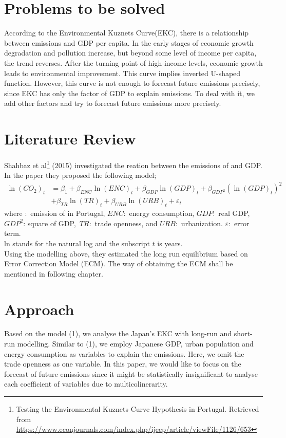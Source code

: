 \documentclass[12pt, a4paper]{article}
\begin{document}
\section{Problems to be solved}
According to the Environmental Kuznets Curve(EKC), there is a relationship between  emissions and GDP per capita. In the early stages of economic growth degradation and pollution increase, but beyond some level of income per capita, the trend reverses. After the turning point of high-income levels, economic growth leads to environmental improvement. This curve implies inverted U-shaped function. However, this curve is not enough to forecast future  emissions precisely, since EKC has only the factor of GDP to explain  emissions. To deal with it, we add other factors and try to forecast future  emissions more precisely.


\section{Literature Review}
Shahbaz et al\footnote{Testing the Environmental Kuznets Curve Hypothesis in Portugal. Retrieved from \url{https://www.econjournals.com/index.php/ijeep/article/viewFile/1126/653}} (2015) investigated the reation between the emissions of  and GDP.  In the paper they proposed the following model; 
\begin{equation}
\begin{split}
\ln{(CO_2)}_{t}&=\beta_1+\beta_{ENC}\ln{(ENC)}_{t}+\beta_{GDP}\ln{(GDP)}_{t}+\beta_{GDP^2}(\ln{(GDP)}_{t})^2\\
&+\beta_{TR}\ln{(TR)}_{t}+\beta_{URB}\ln{(URB)}_{t}+\varepsilon_{t}
\end{split}
\end{equation}
where  :\ emission of   in Portugal, $ENC$:\ energy consumption, $GDP$:\ real GDP, $GDP^2$: square of GDP,\  $TR$:\ trade openness, and $URB$:\ urbanization.  $\varepsilon$:\ error term.\\
ln stands for the natural log and the subscript $t$ is years.\\
Using the modelling above, they estimated the long run equilibrium based on Error Correction Model (ECM).  The way of obtaining the ECM shall be mentioned in following chapter.\\

\section{Approach}
Based on the model (1), we analyse the Japan's EKC with long-run and short-run modelling.  Similar to (1), we employ Japanese GDP, urban population and energy consumption as variables to explain the  emissions.  Here, we omit the trade openness as one variable.  In this paper, we would like to focus on the forecast of future  emissions since it might be statistically insignificant to analyse each coefficient of variables due to multicolinerarity. 
\end{document}
